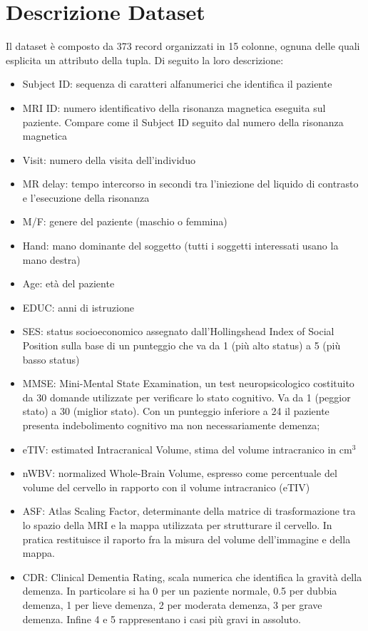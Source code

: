 \section{Descrizione Dataset}
Il dataset è composto da 373 record organizzati in 15 colonne, ognuna delle quali esplicita un attributo della tupla. Di seguito la loro descrizione:
\begin{itemize}
\setlength\itemsep{0.2em}
    \item Subject ID: sequenza di caratteri alfanumerici che identifica il paziente
    \item MRI ID: numero identificativo della risonanza magnetica eseguita sul paziente. Compare come il Subject ID seguito dal numero della risonanza magnetica
    \item Visit: numero della visita dell'individuo
    \item MR delay: tempo intercorso in secondi tra l'iniezione del liquido di contrasto e l'esecuzione della risonanza
    \item M/F: genere del paziente (maschio o femmina)
    \item Hand: mano dominante del soggetto (tutti i soggetti interessati usano la mano destra)
    \item Age: età del paziente
    \item EDUC: anni di istruzione
    \item SES: status socioeconomico assegnato dall'Hollingshead Index of Social Position sulla base di un punteggio che va da 1 (più alto status) a 5 (più basso status)
    \item MMSE: Mini-Mental State Examination, un test neuropsicologico costituito da 30 domande utilizzate per verificare lo stato cognitivo. Va da 1 (peggior stato) a 30 (miglior stato). Con un punteggio inferiore a 24 il paziente presenta indebolimento cognitivo ma non necessariamente demenza;
    \item eTIV: estimated Intracranical Volume, stima del volume intracranico in cm$^3$
    \item nWBV: normalized Whole-Brain Volume, espresso come percentuale del volume del cervello in rapporto con il volume intracranico (eTIV)
    \item ASF: Atlas Scaling Factor, determinante della matrice di trasformazione tra lo spazio della MRI e la mappa utilizzata per strutturare il cervello. In pratica restituisce il raporto fra la misura del volume dell'immagine e della mappa. 
    \item CDR: Clinical Dementia Rating, scala numerica che identifica la gravità della demenza. In particolare si ha 0 per un paziente normale, 0.5 per dubbia demenza, 1 per lieve demenza, 2 per moderata demenza, 3 per grave demenza. Infine 4 e 5 rappresentano i casi più gravi in assoluto.
    \end{itemize}

